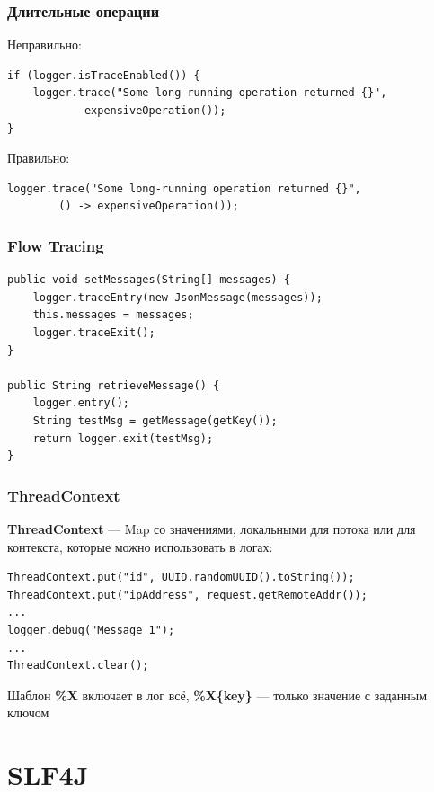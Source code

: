 \documentclass[xetex,mathserif,serif]{beamer}
\begin{document}
	\begin{frame}[fragile]
		\frametitle{Длительные операции}
		Неправильно:
		\begin{verbatim}
if (logger.isTraceEnabled()) {
    logger.trace("Some long-running operation returned {}", 
            expensiveOperation());
}
		\end{verbatim}

		Правильно:
		\begin{verbatim}
logger.trace("Some long-running operation returned {}", 
        () -> expensiveOperation());
		\end{verbatim}
\end{frame}

	\begin{frame}[fragile]
		\frametitle{Flow Tracing}
		\begin{verbatim}
public void setMessages(String[] messages) {
    logger.traceEntry(new JsonMessage(messages));
    this.messages = messages;
    logger.traceExit();
}

public String retrieveMessage() {
    logger.entry();
    String testMsg = getMessage(getKey());
    return logger.exit(testMsg);
}
		\end{verbatim}
\end{frame}

	\begin{frame}[fragile]
		\frametitle{ThreadContext}
		\textbf{ThreadContext} --- Map со значениями, локальными для потока или для контекста, которые можно использовать в логах:
		\begin{verbatim}
ThreadContext.put("id", UUID.randomUUID().toString());
ThreadContext.put("ipAddress", request.getRemoteAddr());
...
logger.debug("Message 1");
...
ThreadContext.clear();
		\end{verbatim}
		Шаблон \textbf{\%X} включает в лог всё, \textbf{\%X\{key\}} --- только значение с заданным ключом
\end{frame}

	\section{SLF4J}
\end{document}
